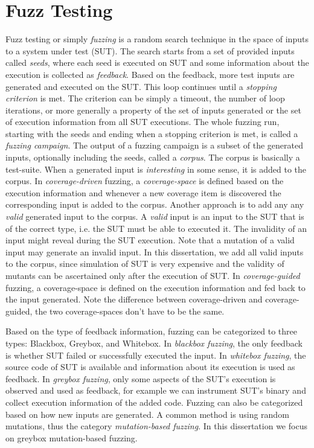 \section{Fuzz Testing}

Fuzz testing or simply \emph{fuzzing} is a random search technique in the space of inputs to a system under test (SUT).
%
The search starts from a set of provided inputs called \emph{seeds}, where each seed is executed on SUT and some information about the execution is collected as \emph{feedback}.
%
Based on the feedback, more test inputs are generated and executed on the SUT.
%
This loop continues until a \emph{stopping criterion} is met.
%
The criterion can be simply a timeout, the number of loop iterations, or more generally a property of the set of inputs generated or the set of execution information from all SUT executions.
%
The whole fuzzing run, starting with the seeds and ending when a stopping criterion is met, is called a \emph{fuzzing campaign}.
%
The output of a fuzzing campaign is a subset of the generated inputs, optionally including the seeds, called a \emph{corpus}.
%
The corpus is basically a test-suite.
%
When a generated input is \emph{interesting} in some sense, it is added to the corpus.
%
In \emph{coverage-driven} fuzzing, a \emph{coverage-space} is defined based on the execution information and whenever a new coverage item is discovered the corresponding input is added to the corpus.
%
Another approach is to add any any \emph{valid} generated input to the corpus.
%
A \emph{valid} input is an input to the SUT that is of the correct type, i.e. the SUT must be able to executed it.
%
The invalidity of an input might reveal during the SUT execution.
%
Note that a mutation of a valid input may generate an invalid input.
%
In this dissertation, we add all valid inputs to the corpus, since simulation of SUT is very expensive and the validity of mutants can be ascertained only after the execution of SUT.
%
In \emph{coverage-guided} fuzzing, a coverage-space is defined on the execution information and fed back to the input generated.
%
Note the difference between coverage-driven and coverage-guided, the two coverage-spaces don't have to be the same.



Based on the type of feedback information, fuzzing can be categorized to three types: Blackbox, Greybox, and Whitebox.
%
In \emph{blackbox fuzzing}, the only feedback is whether SUT failed or successfully executed the input.
%
In \emph{whitebox fuzzing}, the source code of SUT is available and information about its execution is used as feedback.
%
In \emph{greybox fuzzing}, only some aspects of the SUT's execution is observed and used as feedback, for example we can instrument SUT's binary and collect execution information of the added code.
%
Fuzzing can also be categorized based on how new inputs are generated.
%
A common method is using random mutations, thus the category \emph{mutation-based fuzzing}.
%
In this dissertation we focus on greybox mutation-based fuzzing.

